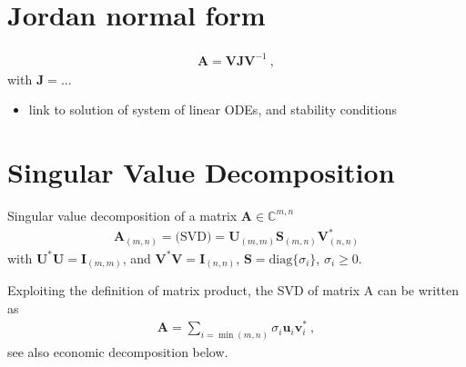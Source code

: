 \documentclass[letterpaper,10pt,english]{jupyterBook}
\begin{document}
\section{Jordan normal form}
\label{\detokenize{ch/linear-algebra/jordan:jordan-normal-form}}\label{\detokenize{ch/linear-algebra/jordan:math-jordan}}\label{\detokenize{ch/linear-algebra/jordan::doc}}\begin{equation*}
\begin{split}\mathbf{A} = \mathbf{V} \mathbf{J} \mathbf{V}^{-1} \ ,\end{split}
\end{equation*}
\sphinxAtStartPar
with \(\mathbf{J} = \dots\)
\begin{itemize}
\item {} 
\sphinxAtStartPar
link to solution of system of linear ODEs, and stability conditions

\end{itemize}

\sphinxstepscope


\section{Singular Value Decomposition}
\label{\detokenize{ch/linear-algebra/svd:singular-value-decomposition}}\label{\detokenize{ch/linear-algebra/svd:math-svd}}\label{\detokenize{ch/linear-algebra/svd::doc}}
\sphinxAtStartPar
Singular value decomposition of a matrix \(\mathbf{A} \in \mathbb{C}^{m,n}\)
\begin{equation*}
\begin{split}\mathbf{A}_{(m,n)} = \text{(SVD)} = \mathbf{U}_{(m,m)} \mathbf{S}_{(m,n)} \mathbf{V}^*_{(n,n)}\end{split}
\end{equation*}
\sphinxAtStartPar
with \(\mathbf{U}^* \mathbf{U} = \mathbf{I}_{(m,m)}\), and \(\mathbf{V}^* \mathbf{V} = \mathbf{I}_{(n,n)}\), \(\mathbf{S} = \text{diag}\{ \sigma_i \}\), \(\sigma_i \ge 0\).

\sphinxAtStartPar
Exploiting the definition of matrix product, the SVD of matrix A can be written as
\begin{equation*}
\begin{split}\mathbf{A} = \sum_{i = \min(m,n)} \sigma_i \mathbf{u}_i \mathbf{v}^*_i \ ,\end{split}
\end{equation*}
\sphinxAtStartPar
see also economic decomposition below.
\end{document}
